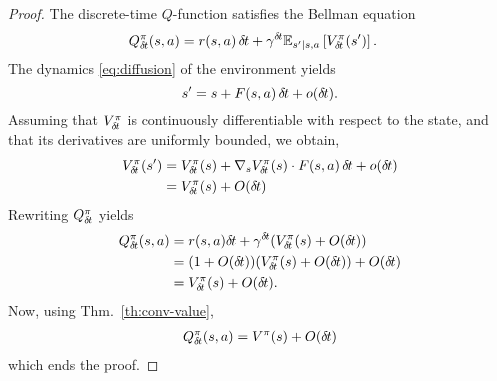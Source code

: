 \begin{proof}
The discrete-time $Q$-function satisfies the Bellman equation
  \begin{align}
    Q^\pi_{\delta\hspace{-.1em}t}(s, a) &= r(s, a)\,{\delta\hspace{-.1em}t} + \gamma^{\delta\hspace{-.1em}t} \mathbb{E}_{s'|s,
    a}\left[V^\pi_{\delta\hspace{-.1em}t}(s')\right] .
  \end{align}
The dynamics \eqref{eq:diffusion} of the environment yields
  \begin{equation}
  s' = s + F(s, a) \,{\delta\hspace{-.1em}t} + o({\delta\hspace{-.1em}t}).
  \end{equation}
  Assuming that $V^\pi_{\delta\hspace{-.1em}t}$ is continuously differentiable with
  respect to the state, and that its derivatives are uniformly bounded, we
  obtain,
  \begin{align}
  V^\pi_{\delta\hspace{-.1em}t}(s') &= V^\pi_{\delta\hspace{-.1em}t}(s) + \nabla_s V^\pi_{\delta\hspace{-.1em}t}(s)\cdot
  F(s, a)\,{\delta\hspace{-.1em}t} + o({\delta\hspace{-.1em}t})\\
		    &= V^\pi_{\delta\hspace{-.1em}t}(s) + O({\delta\hspace{-.1em}t})
  \end{align}
  Rewriting $Q^\pi_{\delta\hspace{-.1em}t}$ yields
  \begin{align}
  Q^\pi_{\delta\hspace{-.1em}t}(s, a) &= r(s, a){\delta\hspace{-.1em}t} + \gamma^{\delta\hspace{-.1em}t} (V^\pi_{\delta\hspace{-.1em}t}(s) + O({\delta\hspace{-.1em}t}))\\
		      &= (1 + O({\delta\hspace{-.1em}t})) (V^\pi_{\delta\hspace{-.1em}t}(s) + O({\delta\hspace{-.1em}t})) + O({\delta\hspace{-.1em}t})\\
		      &= V^\pi_{\delta\hspace{-.1em}t}(s) + O({\delta\hspace{-.1em}t}).
  \end{align}
  Now, using Thm.~\ref{th:conv-value},
  \begin{align}
  Q^\pi_{\delta\hspace{-.1em}t}(s, a) = V^\pi(s) + O({\delta\hspace{-.1em}t})
  \end{align}
  which ends the proof.
  \end{proof}
